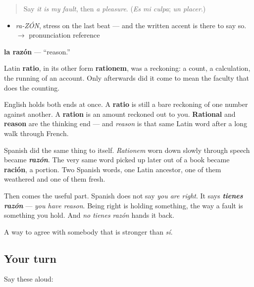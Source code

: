 \label{lesson:ES-C321-razon}



\begin{quote}
Say \emph{it is my fault}, then \emph{a pleasure}. (\emph{Es mi culpa}; \emph{un placer}.)
\end{quote}

\begin{sounds}
\begin{itemize}
\raggedright
  \item \emph{ra-ZÓN}, stress on the last beat — and the written accent is there to say so. $\to$ pronunciation reference
\end{itemize}
\end{sounds}

\begin{cousinweb}
\textbf{la razón} — \textquotedblleft{}reason.\textquotedblright{}

Latin \textbf{ratio}, in its other form \textbf{rationem}, was a reckoning: a count, a calculation, the running of an account. Only afterwards did it come to mean the faculty that does the counting.

English holds both ends at once. A \textbf{ratio} is still a bare reckoning of one number against another. A \textbf{ration} is an amount reckoned out to you. \textbf{Rational} and \textbf{reason} are the thinking end — and \emph{reason} is that same Latin word after a long walk through French.

Spanish did the same thing to itself. \emph{Rationem} worn down slowly through speech became \emph{\textbf{razón}}. The very same word picked up later out of a book became \textbf{ración}, a portion. Two Spanish words, one Latin ancestor, one of them weathered and one of them fresh.

Then comes the useful part. Spanish does not say \emph{you are right}. It says \emph{\textbf{tienes razón}} — \emph{you have reason}. Being right is holding something, the way a fault is something you hold. And \emph{no tienes razón} hands it back.
\end{cousinweb}

\begin{grammarlens}[title={What you've built}]
A way to agree with somebody that is stronger than \emph{sí}.
\end{grammarlens}

\subsection*{Your turn}
Say these aloud:

